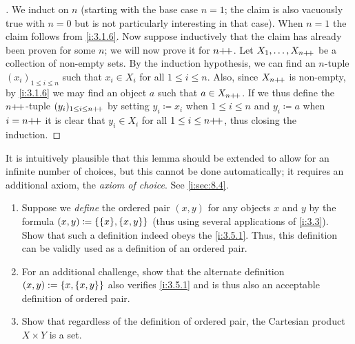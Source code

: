 \begin{proof}[]
  We induct on \(n\) (starting with the base case \(n = 1\); the claim is also vacuously true with \(n = 0\) but is not particularly interesting in that case).
  When \(n = 1\) the claim follows from \cref{i:3.1.6}.
  Now suppose inductively that the claim has already been proven for some \(n\);
  we will now prove it for \(n{+}\!{+}\).
  Let \(X_1, \dots, X_{n{+}\!{+}}\) be a collection of non-empty sets.
  By the induction hypothesis, we can find an \(n\)-tuple \((x_i)_{1 \leq i \leq n}\) such that \(x_i \in X_i\) for all \(1 \leq i \leq n\).
  Also, since \(X_{n{+}\!{+}}\) is non-empty, by \cref{i:3.1.6} we may find an object \(a\) such that \(a \in X_{n{+}\!{+}}\).
  If we thus define the \(n{+}\!{+}\)-tuple \((y_i)_{1 \leq i \leq n{+}\!{+}}\) by setting \(y_i \coloneqq x_i\) when \(1 \leq i \leq n\) and \(y_i \coloneqq a\) when \(i = n{+}\!{+}\) it is clear that \(y_i \in X_i\) for all \(1 \leq i \leq n{+}\!{+}\), thus closing the induction.
\end{proof}

\begin{rmk}\label{i:3.5.13}
  It is intuitively plausible that this lemma should be extended to allow for an infinite number of choices, but this cannot be done automatically;
  it requires an additional axiom, the \emph{axiom of choice}.
  See \cref{i:sec:8.4}.
\end{rmk}

\exercisesection

\begin{ex}\label{i:ex:3.5.1}
  \begin{enumerate}
    \item Suppose we \emph{define} the ordered pair \((x, y)\) for any objects \(x\) and \(y\) by the formula \((x, y) \coloneqq \set{\set{x}, \set{x, y}}\)
          (thus using several applications of \cref{i:3.3}).
          Show that such a definition indeed obeys the \cref{i:3.5.1}.
          Thus, this definition can be validly used as a definition of an ordered pair.
    \item For an additional challenge, show that the alternate definition \((x, y) := \left\lbrace x, \left\lbrace x, y\right\rbrace\right\rbrace\) also verifies \cref{i:3.5.1} and is thus also an acceptable definition of ordered pair.
    \item Show that regardless of the definition of ordered pair, the Cartesian product \(X \times Y\) is a set.
  \end{enumerate}
\end{ex}

